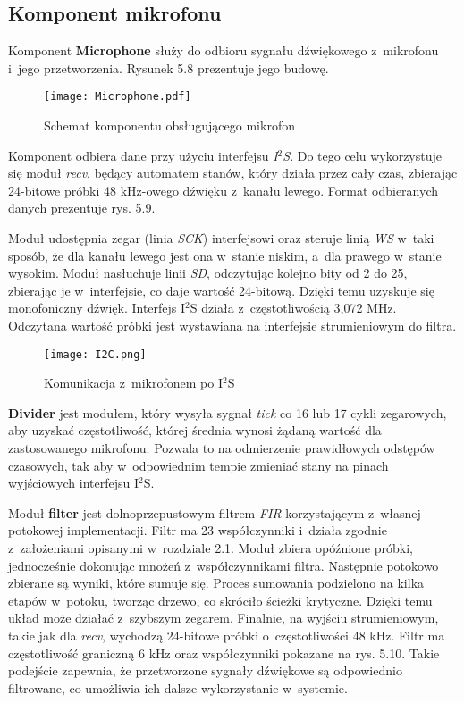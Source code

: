 \subsection{Komponent mikrofonu}
Komponent \textbf{Microphone} służy do odbioru sygnału dźwiękowego z~mikrofonu i~jego przetworzenia. Rysunek 5.8 prezentuje jego budowę.

\begin{figure}[h]
	\centering
	\texttt{[image: Microphone.pdf]}
	\caption{Schemat komponentu obsługującego mikrofon}
\end{figure}
\FloatBarrier %

Komponent odbiera dane przy użyciu interfejsu \textit{I$^2$S}. Do tego celu wykorzystuje się moduł \textit{recv}, będący automatem stanów, który działa przez cały czas, zbierając 24-bitowe próbki 48 kHz-owego dźwięku z~kanału lewego. Format odbieranych danych prezentuje rys. 5.9.

Moduł udostępnia zegar (linia \textit{SCK}) interfejsowi oraz steruje linią \textit{WS} w~taki sposób, że dla kanału lewego jest ona w~stanie niskim, a~dla prawego w~stanie wysokim. Moduł nasłuchuje linii \textit{SD}, odczytując kolejno bity od 2 do 25, zbierając je w~interfejsie, co daje wartość 24-bitową. Dzięki temu uzyskuje się monofoniczny dźwięk. Interfejs I$^2$S działa z~częstotliwością 3,072 MHz. Odczytana wartość próbki jest wystawiana na interfejsie strumieniowym do filtra.

\begin{figure}[h]
	\centering
	\texttt{[image: I2C.png]}
	\caption{Komunikacja z~mikrofonem po I$^2$S}
\end{figure}
\FloatBarrier %

\textbf{Divider} jest modułem, który wysyła sygnał \textit{tick} co 16 lub 17 cykli zegarowych, aby uzyskać częstotliwość, której średnia wynosi żądaną wartość dla zastosowanego mikrofonu. Pozwala to na odmierzenie prawidłowych odstępów czasowych, tak aby w~odpowiednim tempie zmieniać stany na pinach wyjściowych interfejsu I$^2$S.

Moduł \textbf{filter} jest dolnoprzepustowym filtrem \textit{FIR} korzystającym z~własnej potokowej implementacji. Filtr ma 23 współczynniki i~działa zgodnie z~założeniami opisanymi w~rozdziale 2.1. Moduł zbiera opóźnione próbki, jednocześnie dokonując mnożeń z~współczynnikami filtra. Następnie potokowo zbierane są wyniki, które sumuje się. Proces sumowania podzielono na kilka etapów w~potoku, tworząc drzewo, co skróciło ścieżki krytyczne. Dzięki temu układ może działać z~szybszym zegarem. Finalnie, na wyjściu strumieniowym, takie jak dla \textit{recv}, wychodzą 24-bitowe próbki o~częstotliwości 48 kHz. Filtr ma częstotliwość graniczną 6 kHz oraz współczynniki pokazane na rys. 5.10. Takie podejście zapewnia, że przetworzone sygnały dźwiękowe są odpowiednio filtrowane, co umożliwia ich dalsze wykorzystanie w~systemie.

